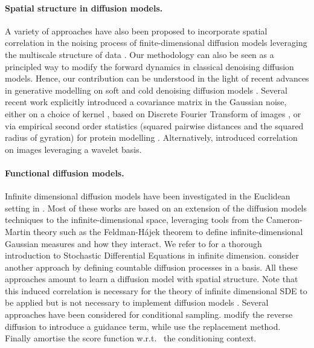\paragraph{Spatial structure in diffusion models.}
A variety of approaches have also been proposed to incorporate spatial correlation in the noising process of finite-dimensional diffusion models leveraging the multiscale structure of data \parencite{jing2022subspace,guth2022wavelet,ho2022cascaded,saharia2021image,hoogeboom2022blurring,rissanen2022Generative}.
Our methodology can also be seen as a principled way to modify the forward dynamics in classical denoising diffusion models.
Hence, our contribution can be understood in the light of recent advances in generative modelling on soft and cold denoising diffusion models \parencite{daras2022soft,bansal2022cold,hoogeboom2022blurring}.
Several recent work explicitly introduced a covariance matrix in the Gaussian noise, either on a choice of kernel \parencite{bilos2022Modeling}, based on Discrete Fourier Transform of images \parencite{voleti2022Scorebased}, or via empirical second order statistics (squared pairwise distances and the squared radius of gyration) for protein modelling \parencite{ingrahamIlluminating}.
Alternatively, \parencite{guth2022wavelet} introduced correlation on images leveraging a wavelet basis.

\paragraph{Functional diffusion models.}
Infinite dimensional diffusion models have been investigated in the Euclidean setting in \cite{kerrigan2022Diffusion,pidstrigach2023InfiniteDimensional,lim2023score,bond2023infty,hagemann2023multilevel,franzese2023continuous,dutordoir2022Neural,phillips2022spectral}.
Most of these works are based on an extension of the diffusion models techniques \cite{song2020score,ho2020denoising} to the infinite-dimensional space, leveraging tools from the Cameron-Martin theory such as the Feldman-H\'{a}jek theorem \cite{kerrigan2022Diffusion,pidstrigach2023InfiniteDimensional} to define infinite-dimensional Gaussian measures and how they interact.
We refer to \cite{da2014stochastic} for a thorough introduction to Stochastic Differential Equations in infinite dimension.
\cite{phillips2022spectral}
consider another approach by defining countable diffusion processes in a
basis.
All these approaches amount to learn a diffusion model with spatial structure.
Note that this induced correlation is necessary for the theory of infinite dimensional SDE \parencite{da2014stochastic} to be applied but is not necessary to implement diffusion models \parencite{dutordoir2022Neural}.
Several approaches have been considered for conditional sampling.
\cite{pidstrigach2023InfiniteDimensional,bond2023infty} modify the reverse diffusion to introduce a guidance term, while
\cite{dutordoir2022Neural,kerrigan2022Diffusion} use the replacement
method.
Finally \cite{phillips2022spectral} amortise the score function w.r.t.
\ the conditioning context.


